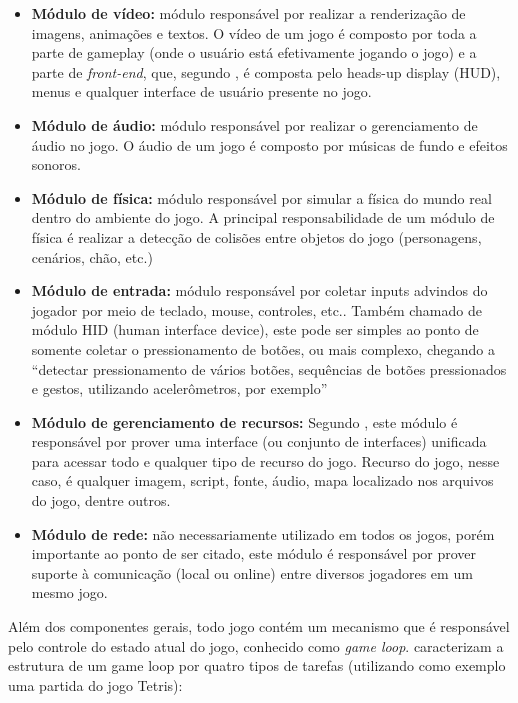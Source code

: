 \begin{itemize}
\item \textbf{Módulo de vídeo:} módulo responsável por realizar a renderização de imagens, animações e textos. O vídeo de um jogo é composto por toda a parte de gameplay (onde o usuário está efetivamente jogando o jogo) e a parte de \textit{front-end}, que, segundo , é composta pelo heads-up display (HUD), menus e qualquer interface de usuário presente no jogo.

\item \textbf{Módulo de áudio:} módulo responsável por realizar o gerenciamento de áudio no jogo. O áudio de um jogo é composto por músicas de fundo e efeitos sonoros.

\item \textbf{Módulo de física:} módulo responsável por simular a física do mundo real dentro do ambiente do jogo. A principal responsabilidade de um módulo de física é realizar a detecção de colisões entre objetos do jogo (personagens, cenários, chão, etc.)

\item \textbf{Módulo de entrada:} módulo responsável por coletar inputs advindos do jogador por meio de teclado, mouse, controles, etc.. Também chamado de módulo HID (human interface device), este pode ser simples ao ponto de somente coletar o pressionamento de botões, ou mais complexo, chegando a “detectar pressionamento de vários botões, sequências de botões pressionados e gestos, utilizando acelerômetros, por exemplo” \cite[p.~43]{gregory2014game}

\item \textbf{Módulo de gerenciamento de recursos:} Segundo , este módulo é responsável por prover uma interface (ou conjunto de interfaces) unificada para acessar todo e qualquer tipo de recurso do jogo. Recurso do jogo, nesse caso, é qualquer imagem, script, fonte, áudio, mapa localizado nos arquivos do jogo, dentre outros.

\item \textbf{Módulo de rede:} não necessariamente utilizado em todos os jogos, porém importante ao ponto de ser citado, este módulo é responsável por prover suporte à comunicação (local ou online) entre diversos jogadores em um mesmo jogo.
\end{itemize}


Além dos componentes gerais, todo jogo contém um mecanismo que é responsável pelo controle do estado atual do jogo, conhecido como \textit{game loop}.  caracterizam a estrutura de um game loop por quatro tipos de tarefas (utilizando como exemplo uma partida do jogo Tetris):

